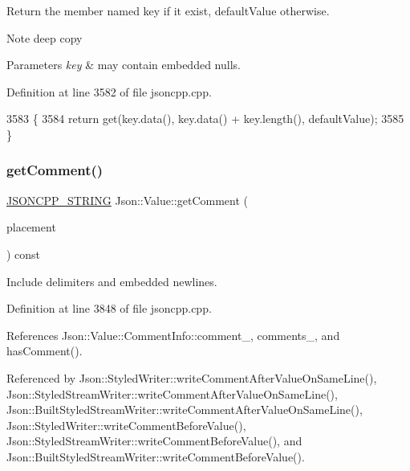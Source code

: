 Return the member named key if it exist, default\+Value otherwise. \begin{DoxyNote}{Note}
deep copy 
\end{DoxyNote}

\begin{DoxyParams}{Parameters}
{\em key} & may contain embedded nulls. \\
\hline
\end{DoxyParams}


Definition at line 3582 of file jsoncpp.\+cpp.


\begin{DoxyCode}
3583 \{
3584   \textcolor{keywordflow}{return} \textcolor{keyword}{get}(key.data(), key.data() + key.length(), defaultValue);
3585 \}
\end{DoxyCode}
\mbox{\label{class_json_1_1_value_a82817229a986f0b254e31d5c83066ffe}} 
\subsubsection{\texorpdfstring{get\+Comment()}{getComment()}}
{\footnotesize\ttfamily \hyperlink{json_8h_a1e723f95759de062585bc4a8fd3fa4be}{J\+S\+O\+N\+C\+P\+P\+\_\+\+S\+T\+R\+I\+NG} Json\+::\+Value\+::get\+Comment (\begin{DoxyParamCaption}\item[{\hyperlink{namespace_json_a4fc417c23905b2ae9e2c47d197a45351}{Comment\+Placement}}]{placement }\end{DoxyParamCaption}) const}



Include delimiters and embedded newlines. 



Definition at line 3848 of file jsoncpp.\+cpp.



References Json\+::\+Value\+::\+Comment\+Info\+::comment\+\_\+, comments\+\_\+, and has\+Comment().



Referenced by Json\+::\+Styled\+Writer\+::write\+Comment\+After\+Value\+On\+Same\+Line(), Json\+::\+Styled\+Stream\+Writer\+::write\+Comment\+After\+Value\+On\+Same\+Line(), Json\+::\+Built\+Styled\+Stream\+Writer\+::write\+Comment\+After\+Value\+On\+Same\+Line(), Json\+::\+Styled\+Writer\+::write\+Comment\+Before\+Value(), Json\+::\+Styled\+Stream\+Writer\+::write\+Comment\+Before\+Value(), and Json\+::\+Built\+Styled\+Stream\+Writer\+::write\+Comment\+Before\+Value().


